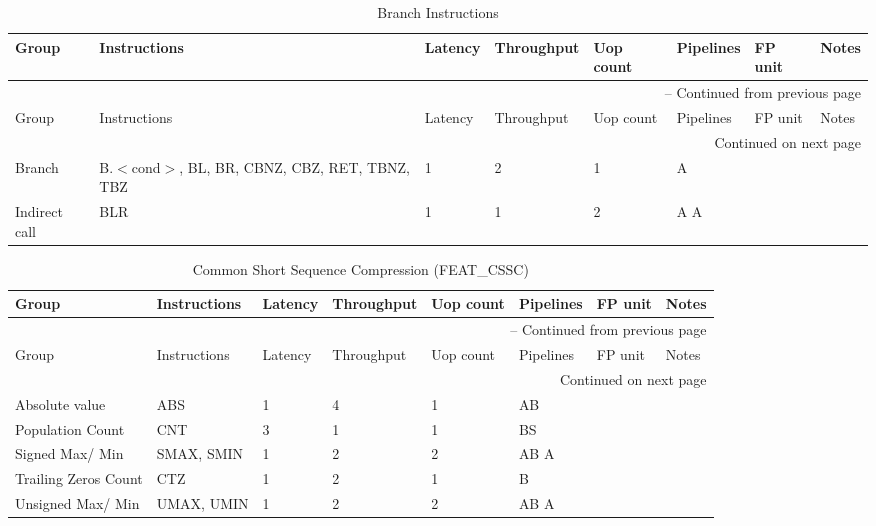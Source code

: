 \newpage
\begin{longtable}{|p{1in}|p{1in}|l|l|l|p{1in}|l|p{1in}|}
\caption{Branch Instructions} \\
\hline
Group & Instructions & Latency & Throughput & Uop count & Pipelines & FP unit & Notes\\
\hline
\endfirsthead
\hline
\multicolumn{8}{|r|}{{\tablename\ \thetable{} -- Continued from previous page}} \\
\hline
Group & Instructions & Latency & Throughput & Uop count & Pipelines & FP unit & Notes\\
\hline
\endhead
\hline
\multicolumn{8}{|r|}{{Continued on next page}} \\
\hline
\endfoot
\hline
\endlastfoot
Branch & B.$<$cond$>$, BL, BR, CBNZ, CBZ, RET, TBNZ, TBZ & 1 & 2 & 1 & A &  & \\
\hline
Indirect call & BLR & 1 & 1 & 2 & A A &  & \\
\hline
\end{longtable}
\newpage
\begin{longtable}{|p{1in}|p{1in}|l|l|l|p{1in}|l|p{1in}|}
\caption{Common Short Sequence Compression (FEAT\_CSSC)} \\
\hline
Group & Instructions & Latency & Throughput & Uop count & Pipelines & FP unit & Notes\\
\hline
\endfirsthead
\hline
\multicolumn{8}{|r|}{{\tablename\ \thetable{} -- Continued from previous page}} \\
\hline
Group & Instructions & Latency & Throughput & Uop count & Pipelines & FP unit & Notes\\
\hline
\endhead
\hline
\multicolumn{8}{|r|}{{Continued on next page}} \\
\hline
\endfoot
\hline
\endlastfoot
Absolute value & ABS & 1 & 4 & 1 & AB &  & \\
\hline
Population Count & CNT & 3 & 1 & 1 & BS &  & \\
\hline
Signed Max/ Min & SMAX, SMIN & 1 & 2 & 2 & AB A &  & \\
\hline
Trailing Zeros Count & CTZ & 1 & 2 & 1 & B &  & \\
\hline
Unsigned Max/ Min & UMAX, UMIN & 1 & 2 & 2 & AB A &  & \\
\hline
\end{longtable}
\newpage

